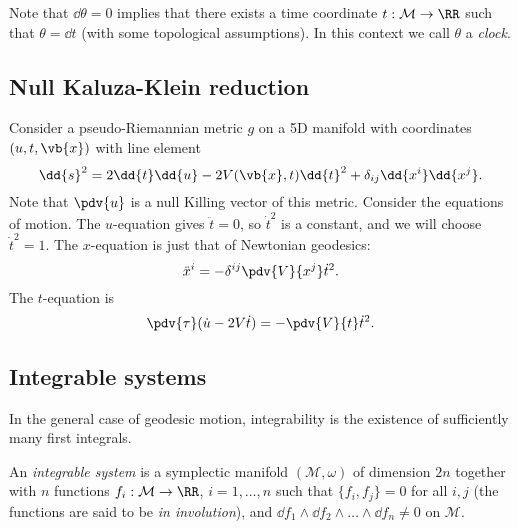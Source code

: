 \documentclass{jknotes}
\begin{document}
Note that \(\dd{\theta}=0\) implies that there exists a time coordinate \(t:\mathcal{M}\to\RR\) such that \(\theta=\dd{t}\) (with some topological assumptions). In this context we call \(\theta\) a \emph{clock}.

\subsection{Null Kaluza-Klein reduction}
Consider a pseudo-Riemannian metric \(g\) on a 5D manifold with coordinates \((u,t,\vb{x})\) with line element
\begin{equation}
    \dd{s}^2 = 2\dd{t}\dd{u}-2V(\vb{x},t)\dd{t}^2 + \delta_{ij}\dd{x^i}\dd{x^j}.
\end{equation}
Note that \(\pdv{u}\) is a null Killing vector of this metric. Consider the equations of motion. The \(u\)-equation gives \(\ddot{t}=0\), so \(\dot{t}^2\) is a constant, and we will choose \(\dot{t}^2=1\). The \(x\)-equation is just that of Newtonian geodesics:
\begin{equation}
    \ddot{x}^i=-\delta^{ij}\pdv{V}{x^j}\dot{t}^2.
\end{equation}
The \(t\)-equation is
\begin{equation}
    \pdv{\tau}(\dot{u}-2V\dot{t}) = -\pdv{V}{t}\dot{t}^2.
\end{equation}

\subsection{Integrable systems}
In the general case of geodesic motion, integrability is the existence of sufficiently many first integrals.

\begin{defn}
    An \emph{integrable system} is a symplectic manifold \((\mathcal{M},\omega)\) of dimension \(2n\) together with \(n\) functions \(f_i:\mathcal{M}\to\RR\), \(i=1,\dots,n\) such that \(\{f_i,f_j\}=0\) for all \(i,j\) (the functions are said to be \emph{in involution}), and \(\dd{f_1}\wedge\dd{f_2}\wedge\dots\wedge\dd{f_n}\ne0\) on \(\mathcal{M}\).
\end{defn}
\end{document}
